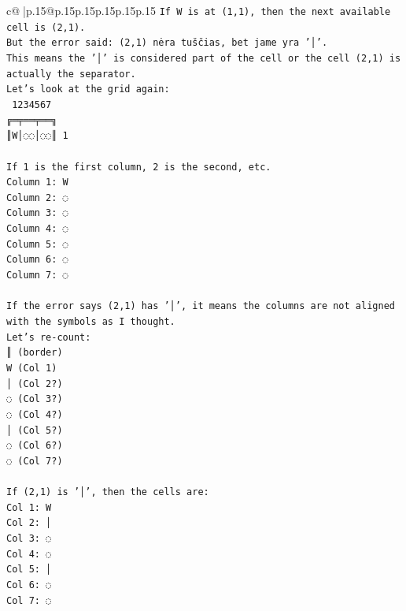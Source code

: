 \documentclass{article}
\begin{document}
{\begin{supertabular}{c@{$\;$}|p{.15\linewidth}@{}p{.15\linewidth}p{.15\linewidth}p{.15\linewidth}p{.15\linewidth}p{.15\linewidth}}
{{{\texttt{If W is at (1,1), then the next available cell is (2,1).} \\
\texttt{But the error said: (2,1) nėra tuščias, bet jame yra '│'.} \\
\texttt{This means the '│' is considered part of the cell or the cell (2,1) is actually the separator.} \\
\texttt{Let's look at the grid again:} \\
\texttt{ 1234567} \\
\texttt{╔═╤══╤══╗} \\
\texttt{║W│◌◌│◌◌║ 1} \\
\\ 
\texttt{If 1 is the first column, 2 is the second, etc.} \\
\texttt{Column 1: W} \\
\texttt{Column 2: ◌} \\
\texttt{Column 3: ◌} \\
\texttt{Column 4: ◌} \\
\texttt{Column 5: ◌} \\
\texttt{Column 6: ◌} \\
\texttt{Column 7: ◌} \\
\\ 
\texttt{If the error says (2,1) has '│', it means the columns are not aligned with the symbols as I thought.} \\
\texttt{Let's re{-}count:} \\
\texttt{║ (border)} \\
\texttt{W (Col 1)} \\
\texttt{│ (Col 2?)} \\
\texttt{◌ (Col 3?)} \\
\texttt{◌ (Col 4?)} \\
\texttt{│ (Col 5?)} \\
\texttt{◌ (Col 6?)} \\
\texttt{◌ (Col 7?)} \\
\\ 
\texttt{If (2,1) is '│', then the cells are:} \\
\texttt{Col 1: W} \\
\texttt{Col 2: │} \\
\texttt{Col 3: ◌} \\
\texttt{Col 4: ◌} \\
\texttt{Col 5: │} \\
\texttt{Col 6: ◌} \\
\texttt{Col 7: ◌} \\
\\ 
}}}
\end{supertabular}}
\end{document}
